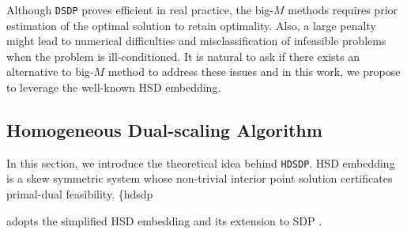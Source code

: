 \documentclass[10pt]{article}
\begin{document}
{{Although {{\texttt{DSDP}}} proves efficient in real practice, the big-$M$
methods requires prior estimation of the optimal solution to retain optimality. 
Also, a large penalty might lead to numerical difficulties and
misclassification of infeasible problems when the problem is ill-conditioned. 
It is natural to ask if there exists an alternative to
big-$M$ method to address these issues and in this work, we propose to
leverage the well-known HSD embedding.

\subsection{Homogeneous Dual-scaling Algorithm}

In this section, we introduce the theoretical idea behind {{\texttt{HDSDP}}}.
HSD embedding is a skew symmetric system whose non-trivial interior point
solution certificates primal-dual feasibility. \{hdsdp} adopts the simplified
HSD embedding {\cite{xu1996simplified}} and its extension to SDP
{\cite{potra1998homogeneous}}.\\

}
\end{document}
